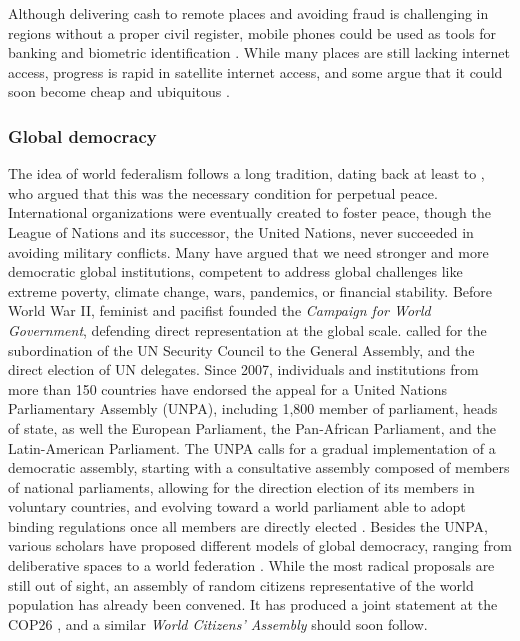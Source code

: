 Although delivering cash to remote places and avoiding fraud is challenging in regions without a proper civil register, mobile phones could be used as tools for banking and biometric identification \citep{harnett_taking_2017}. While many places are still lacking internet access, progress is rapid in satellite internet access, and some argue that it could soon become cheap and ubiquitous \citep{hanson_satellite_2016}.

\subsubsection{Global democracy}\label{subsubsec:literature_democracy}

The idea of world federalism follows a long tradition, dating back at least to \citet{kant_zum_1795}, who argued that this was the necessary condition for perpetual peace. 
International organizations were eventually created to foster peace, though the League of Nations and its successor, the United Nations, never succeeded in avoiding military conflicts. 
Many have argued that we need stronger and more democratic global institutions, competent to address global challenges like extreme poverty, climate change, wars, pandemics, or financial stability. 
Before World War II, feminist and pacifist \citet{maverick_lloyd_chaos_1937} founded the \textit{Campaign for World Government}, defending direct representation at the global scale. 
\citet{einstein_general_1947} called for the subordination of the UN Security Council to the General Assembly, and the direct election of UN delegates. 
Since 2007, individuals and institutions from more than 150 countries have endorsed the appeal for a United Nations Parliamentary Assembly (UNPA), including 1,800 member of parliament, heads of state, as well the European Parliament, the Pan-African Parliament, and the Latin-American Parliament. The UNPA calls for a gradual implementation of a democratic assembly, starting with a consultative assembly composed of members of national parliaments, allowing for the direction election of its members in voluntary countries, and evolving toward a world parliament able to adopt binding regulations once all members are directly elected \citep{leinen_world_2018}. %
Besides the UNPA, various scholars have proposed different models of global democracy, ranging from deliberative spaces to a world federation \citep{archibugi_global_2011}. %
While the most radical proposals are still out of sight, an assembly of random citizens representative of the world population has already been convened. It has produced a joint statement at the COP26 \citep{global_assembly_report_2022}, and a similar \textit{World Citizens' Assembly} should soon follow. 

